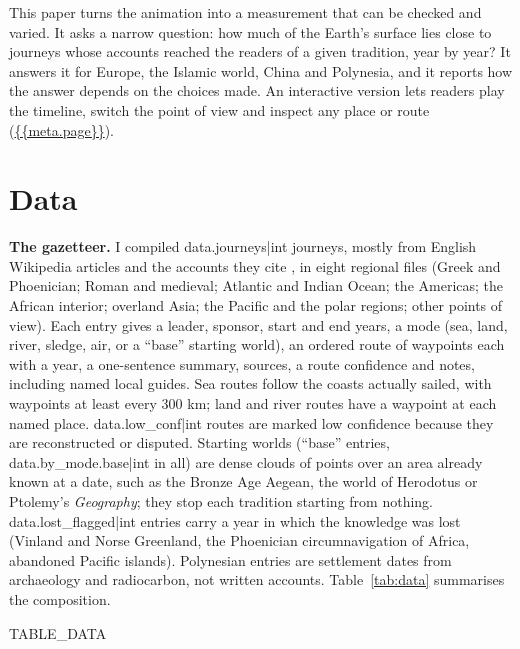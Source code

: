 \documentclass[11pt,a4paper]{article}
\begin{document}
This paper turns the animation into a measurement that can be checked and varied. It asks a narrow question: how much of the Earth's surface lies close to journeys whose accounts reached the readers of a given tradition, year by year? It answers it for Europe, the Islamic world, China and Polynesia, and it reports how the answer depends on the choices made. An interactive version lets readers play the timeline, switch the point of view and inspect any place or route (\url{{{meta.page}}}).

\section{Data}
\textbf{The gazetteer.} I compiled {{data.journeys|int}} journeys, mostly from English Wikipedia articles and the accounts they cite \citep{wiki}, in eight regional files (Greek and Phoenician; Roman and medieval; Atlantic and Indian Ocean; the Americas; the African interior; overland Asia; the Pacific and the polar regions; other points of view). Each entry gives a leader, sponsor, start and end years, a mode (sea, land, river, sledge, air, or a ``base'' starting world), an ordered route of waypoints each with a year, a one-sentence summary, sources, a route confidence and notes, including named local guides. Sea routes follow the coasts actually sailed, with waypoints at least every 300 km; land and river routes have a waypoint at each named place. {{data.low_conf|int}} routes are marked low confidence because they are reconstructed or disputed. Starting worlds (``base'' entries, {{data.by_mode.base|int}} in all) are dense clouds of points over an area already known at a date, such as the Bronze Age Aegean, the world of Herodotus or Ptolemy's \textit{Geography}; they stop each tradition starting from nothing. {{data.lost_flagged|int}} entries carry a year in which the knowledge was lost (Vinland and Norse Greenland, the Phoenician circumnavigation of Africa, abandoned Pacific islands). Polynesian entries are settlement dates from archaeology and radiocarbon, not written accounts. Table~\ref{tab:data} summarises the composition.

{{TABLE_DATA}}
\end{document}
